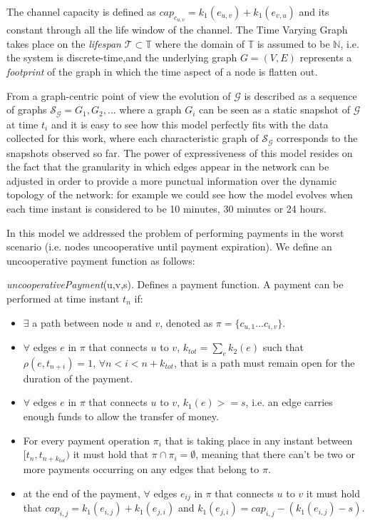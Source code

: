 	The channel capacity is defined as $cap_{c_{u,v}} = k_1(e_{u,v}) + k_1(e_{v,u})$ and its constant through all the life window of the channel.
	The Time Varying Graph takes place on the \textit{lifespan} $\mathcal{T}  \subset \mathbb{T}$ where the domain of $\mathbb{T}$ is assumed to be $\mathbb{N}$, i.e. the system is discrete-time,and the underlying graph $G = (V, E)$ represents a \textit{footprint} of the graph in which the time aspect of a node is flatten out. 
	
	From a graph-centric point of view the evolution of $\mathcal{G}$ is described as a sequence of graphs $\mathcal{S}_{\mathcal{G}} = G_1, G_2, ... $ where a graph $G_i$ can be seen as a static snapshot of $\mathcal{G}$ at time $t_i$ and it is easy to see how this model perfectly fits with the data collected for this work, where each characteristic graph of $\mathcal{S}_{\mathcal{G}}$ corresponds to the snapshots observed so far. The power of expressiveness of this model resides on the fact that the granularity in which edges appear in the network can be adjusted in order to provide a more punctual information over the dynamic topology of the network: for example we could see how the model evolves when each time instant is considered to be 10 minutes, 30 minutes or 24 hours.

	In this model we addressed the problem of performing payments in the worst scenario (i.e. nodes uncooperative until payment expiration). We define an uncooperative payment function as follows:
	\begin{definition}
		\textit{uncooperativePayment}(u,v,s). Defines a payment function. A payment can be performed at time instant $t_n$ if:
		\begin{itemize}
			
			\item $\exists$ a path between node $u$ and $v$, denoted as $\pi =  \{c_{u,1} ... {c_{i,v}}\}$.
			\item $\forall$ edges $e$ in $\pi$ that connects $u$ to $v$, $k_{tot} = \sum_{e} k_2(e)$ such that $\rho(e, t_{n+i}) = 1, \, \forall n < i < n + k_{tot}$, that is a path must remain open for the duration of the payment.
			\item $\forall$ edges $e$ in $\pi$ that connects $u$ to $v$, $k_1(e) >= s$, i.e. an edge carries enough funds to allow the transfer of money.
			\item For every payment operation $\pi_i$ that is taking place in any instant between $[t_n, t_{n + k_{tot}})$ it must hold that $\pi \cap \pi_i = \emptyset$, meaning that there can't be two or more payments occurring on any edges that belong to $\pi$.
			\item at the end of the payment, $\forall$ edges $e_{ij}$ in $\pi$ that connects $u$ to $v$ it must hold that $cap_{i,j} = k_1(e_{i,j}) + k_1(e_{j,i})$ and $k_1(e_{j,i}) = cap_{i,j} - (k_1(e_{i,j}) - s)$.
		\end{itemize}
	\end{definition}

